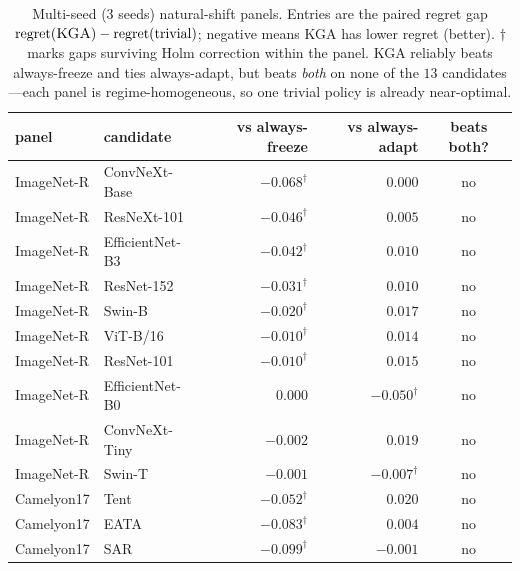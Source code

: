 \documentclass[11pt]{article}
\theoremstyle{plain}
\theoremstyle{definition}
\begin{document}
\begin{table}[h]\centering\small
\begin{tabular}{llrrc}
\toprule
panel & candidate & vs always-freeze & vs always-adapt & beats both? \\
\midrule
ImageNet-R & ConvNeXt-Base & $-0.068^{\dagger}$ & $\phantom{-}0.000$ & no \\
ImageNet-R & ResNeXt-101 & $-0.046^{\dagger}$ & $\phantom{-}0.005$ & no \\
ImageNet-R & EfficientNet-B3 & $-0.042^{\dagger}$ & $\phantom{-}0.010$ & no \\
ImageNet-R & ResNet-152 & $-0.031^{\dagger}$ & $\phantom{-}0.010$ & no \\
ImageNet-R & Swin-B & $-0.020^{\dagger}$ & $\phantom{-}0.017$ & no \\
ImageNet-R & ViT-B/16 & $-0.010^{\dagger}$ & $\phantom{-}0.014$ & no \\
ImageNet-R & ResNet-101 & $-0.010^{\dagger}$ & $\phantom{-}0.015$ & no \\
ImageNet-R & EfficientNet-B0 & $\phantom{-}0.000$ & $-0.050^{\dagger}$ & no \\
ImageNet-R & ConvNeXt-Tiny & $-0.002$ & $\phantom{-}0.019$ & no \\
ImageNet-R & Swin-T & $-0.001$ & $-0.007^{\dagger}$ & no \\
\midrule
Camelyon17 & Tent & $-0.052^{\dagger}$ & $\phantom{-}0.020$ & no \\
Camelyon17 & EATA & $-0.083^{\dagger}$ & $\phantom{-}0.004$ & no \\
Camelyon17 & SAR & $-0.099^{\dagger}$ & $-0.001$ & no \\
\bottomrule
\end{tabular}
\caption{Multi-seed ($3$ seeds) natural-shift panels. Entries are the paired regret
gap $\mathrm{regret}(\textsc{KGA})-\mathrm{regret}(\text{trivial})$; negative means
\textsc{KGA} has lower regret (better). $\dagger$ marks gaps surviving Holm correction
within the panel. \textsc{KGA} reliably beats always-freeze and ties always-adapt, but
beats \emph{both} on none of the $13$ candidates---each panel is regime-homogeneous, so
one trivial policy is already near-optimal.}
\label{tab:natural}
\end{table}
\end{document}
